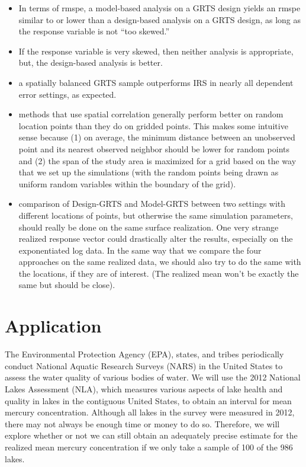 \documentclass[]{elsarticle} %
\providecommand{\tightlist}{%
  \setlength{\itemsep}{0pt}\setlength{\parskip}{0pt}}
\begin{document}
\begin{itemize}
\tightlist
\item
  In terms of rmspe, a model-based analysis on a GRTS design yields an
  rmspe similar to or lower than a design-based analysis on a GRTS
  design, as long as the response variable is not ``too skewed.''
\item
  If the response variable is very skewed, then neither analysis is
  appropriate, but, the design-based analysis is better.
\item
  a spatially balanced GRTS sample outperforms IRS in nearly all
  dependent error settings, as expected.
\item
  methods that use spatial correlation generally perform better on
  random location points than they do on gridded points. This makes some
  intuitive sense because (1) on average, the minimum distance between
  an unobserved point and its nearest observed neighbor should be lower
  for random points and (2) the span of the study area is maximized for
  a grid based on the way that we set up the simulations (with the
  random points being drawn as uniform random variables within the
  boundary of the grid).
\item
  comparison of Design-GRTS and Model-GRTS between two settings with
  different locations of points, but otherwise the same simulation
  parameters, should really be done on the same surface realization. One
  very strange realized response vector could drastically alter the
  results, especially on the exponentiated log data. In the same way
  that we compare the four approaches on the same realized data, we
  should also try to do the same with the locations, if they are of
  interest. (The realized mean won't be exactly the same but should be
  close).
\end{itemize}

\hypertarget{application}{%
\section{Application}\label{application}}

The Environmental Protection Agency (EPA), states, and tribes
periodically conduct National Aquatic Research Surveys (NARS) in the
United States to assess the water quality of various bodies of water. We
will use the 2012 National Lakes Assessment (NLA), which measures
various aspects of lake health and quality in lakes in the contiguous
United States, to obtain an interval for mean mercury concentration.
Although all lakes in the survey were measured in 2012, there may not
always be enough time or money to do so. Therefore, we will explore
whether or not we can still obtain an adequately precise estimate for
the realized mean mercury concentration if we only take a sample of 100
of the 986 lakes.
\end{document}
